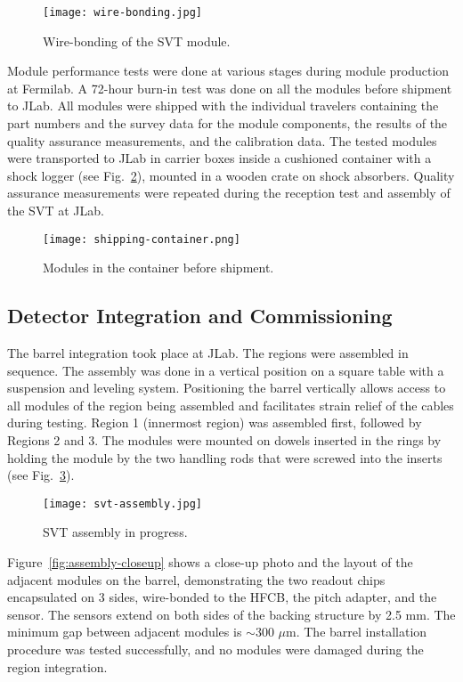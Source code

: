 \begin{figure}[h] 
\centering 
\texttt{[image: wire-bonding.jpg]}
\caption{Wire-bonding of the SVT module.}
\label{fig:wire-bonding}
\end{figure}

Module performance tests were done at various stages during module production at Fermilab. A 72-hour burn-in test was done on all the modules before shipment to JLab. All modules were shipped with the individual travelers containing the part numbers and the survey data for the module components, the results of the quality assurance measurements, and the calibration data. The tested modules were transported to JLab in carrier boxes inside a cushioned container with a shock logger (see Fig.~\ref{fig:shipping-container}), mounted in a wooden crate on shock absorbers. Quality assurance measurements were repeated during the reception test and assembly of the SVT at JLab. 

\begin{figure}[h] 
\centering 
\texttt{[image: shipping-container.png]}
\caption{Modules in the container before shipment.}
\label{fig:shipping-container}
\end{figure}

\subsection{Detector Integration and Commissioning}

The barrel integration took place at JLab. The regions were assembled in sequence. The assembly was done in a vertical position on a square table with a suspension and leveling system. Positioning the barrel vertically allows access to all modules of the region being assembled and facilitates strain relief of the cables during testing. Region 1 (innermost region) was assembled first, followed by Regions 2 and 3. The modules were mounted on dowels inserted in the rings by holding the module by the two handling rods that were screwed into the inserts (see Fig.~\ref{fig:svt-assembly}). 

\begin{figure}[h] 
\centering 
\texttt{[image: svt-assembly.jpg]}
\caption{SVT assembly in progress.}
\label{fig:svt-assembly}
\end{figure}

Figure~\ref{fig:assembly-closeup} shows a close-up photo and the layout of the adjacent modules on the barrel, demonstrating the two readout chips encapsulated on 3 sides, wire-bonded to the HFCB, the pitch adapter, and the sensor. The sensors extend on both sides of the backing structure by 2.5 mm. The minimum gap between adjacent modules is $\sim$300 $\mu$m. The barrel installation procedure was tested successfully, and no modules were damaged during the region integration.

